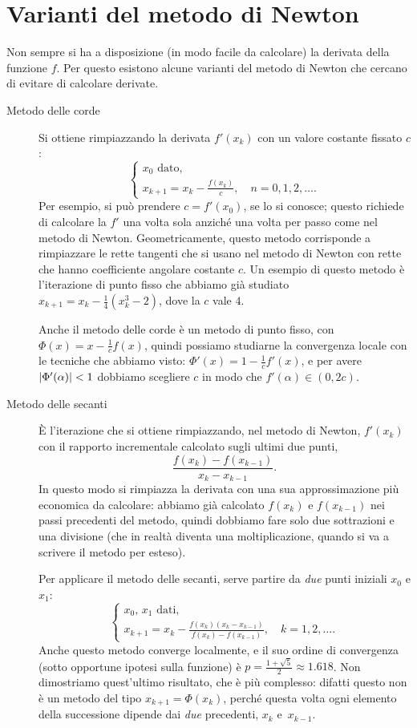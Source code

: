 \documentclass[a4paper]{report}
\DeclarePairedDelimiter{\abs}{\lvert}{\rvert}
\theoremstyle{definition}
\theoremstyle{remark}
\begin{document}
\section{Varianti del metodo di Newton} Non sempre si ha a disposizione (in modo facile da calcolare) la derivata della funzione $f$. Per questo esistono alcune varianti del metodo di Newton che cercano di evitare di calcolare derivate.
\begin{description}
    \item[Metodo delle corde] Si ottiene rimpiazzando la derivata $f'(x_k)$ con un valore costante fissato $c$:
        \[
            \begin{cases}
                \text{$x_0$ dato},\\
                x_{k+1} = x_k - \frac{f(x_k)}{c}, \quad n=0,1,2,\dots.
            \end{cases}
        \]    
    Per esempio, si può prendere $c = f'(x_0)$, se lo si conosce; questo richiede di calcolare la $f'$ una volta sola anziché una volta per passo come nel metodo di Newton. Geometricamente, questo metodo corrisponde a rimpiazzare le rette tangenti che si usano nel metodo di Newton con rette che hanno coefficiente angolare costante $c$. Un esempio di questo metodo è l'iterazione di punto fisso che abbiamo già studiato $x_{k+1} = x_{k} - \frac14 (x_k^3-2)$, dove la $c$ vale $4$. 
    
    Anche il metodo delle corde è un metodo di punto fisso, con $\Phi(x) = x - \frac{1}{c}f(x)$, quindi possiamo studiarne la convergenza locale con le tecniche che abbiamo visto: $\Phi'(x) = 1 - \frac{1}{c}f'(x)$, e per avere $\abs{\Phi'(\alpha)} < 1$ dobbiamo scegliere $c$ in modo che $f'(\alpha) \in (0,2c)$.
    \item[Metodo delle secanti] È l'iterazione che si ottiene rimpiazzando, nel metodo di Newton, $f'(x_k)$ con il rapporto incrementale calcolato sugli ultimi due punti,
    \[
    \frac{f(x_k) - f(x_{k-1})}{x_k - x_{k-1}}.
    \]
    In questo modo si rimpiazza la derivata con una sua approssimazione più economica da calcolare: abbiamo già calcolato $f(x_k)$ e $f(x_{k-1})$ nei passi precedenti del metodo, quindi dobbiamo fare solo due sottrazioni e una divisione (che in realtà diventa una moltiplicazione, quando si va a scrivere il metodo per esteso). 
    
    Per applicare il metodo delle secanti, serve partire da \emph{due} punti iniziali $x_0$ e $x_1$:
    \[
    \begin{cases}
        \text{$x_0$, $x_1$ dati},\\
        x_{k+1} = x_k - \frac{f(x_k) (x_k - x_{k-1})}{f(x_k) - f(x_{k-1})}, \quad k=1,2,\dots.
    \end{cases}
    \]
    Anche questo metodo converge localmente, e il suo ordine di convergenza (sotto opportune ipotesi sulla funzione) è $p = \frac{1+\sqrt{5}}{2} \approx 1.618$. Non dimostriamo quest'ultimo risultato, che è più complesso: difatti questo non è un metodo del tipo $x_{k+1} = \Phi(x_k)$, perché questa volta ogni elemento della successione dipende dai \emph{due} precedenti, $x_k$ e~$x_{k-1}$. 
    
\end{description}
\end{document}
